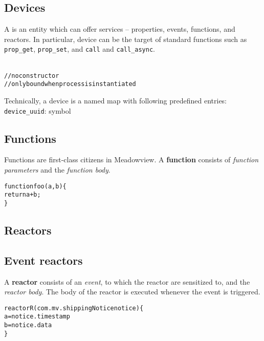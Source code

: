 \documentclass{note}\usepackage{mathptm,mydef}
\begin{document}
\subsection{Devices}
A \textcolor{blue2}{} is an entity which can offer services --
properties, events,  functions, and reactors.
In particular, device can be the target of 
standard functions such as
\verb+prop_get+, \verb+prop_set+, and \verb+call+ and \verb+call_async+.

\begin{alltt}
  \textcolor{red2}{
  // no constructor
  // only bound when process is instantiated
}
\end{alltt}

Technically, a device is a named map with following predefined entries:
\bit
\w \textcolor{red2}{\texttt{device\_uuid}}: symbol
\eit




\subsection{Functions}
Functions are first-class citizens in Meadowview.
A \textcolor{blue2}{\textbf{function}} consists of {\em function parameters\/}
and the {\em function body\/}. 

\begin{alltt}
  \textcolor{red2}{function foo(a, b) \{
    return a + b;
  \}
}
\end{alltt}

\subsection{Reactors}
\subsection{Event reactors}
A \textcolor{blue2}{\textbf{reactor}} consists of an {\em event\/}, to
which the reactor are sensitized to, and the {\em reactor body\/}. 
The body of the reactor is executed whenever the event is triggered.
\begin{alltt}
  \textcolor{red2}{reactor R(com.mv.shippingNotice notice) \{
    a = notice.timestamp
    b = notice.data
  \}}
\end{alltt}
\end{document}
